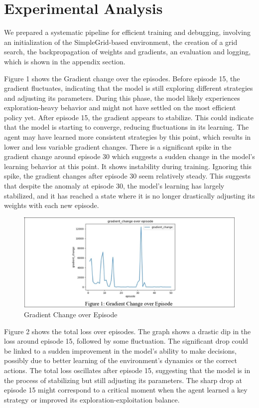 \documentclass[a4paper,11pt]{article}
\begin{document}
\section{Experimental Analysis}

We prepared a systematic pipeline for efficient training and debugging, involving an initialization of the SimpleGrid-based environment, the creation of a grid search, the backpropagation of weights and gradients, an evaluation and logging, which is shown in the appendix section. 

Figure 1 shows the Gradient change over the episodes. Before episode 15, the gradient fluctuates, indicating that the model is still exploring different strategies and adjusting its parameters. During this phase, the model likely experiences exploration-heavy behavior and might not have settled on the most efficient policy yet. After episode 15, the gradient appears to stabilize. This could indicate that the model is starting to converge, reducing fluctuations in its learning. The agent may have learned more consistent strategies by this point, which results in lower and less variable gradient changes. There is a significant spike in the gradient change around episode 30 which suggests a sudden change in the model’s learning behavior at this point. It shows instability during training. Ignoring this spike, the gradient changes after episode 30 seem relatively steady. This suggests that despite the anomaly at episode 30, the model’s learning has largely stabilized, and it has reached a state where it is no longer drastically adjusting its weights with each new episode. 

\begin{figure}[H]
    \centering
    \includegraphics[width=0.75\linewidth]{fig1.png}
    \caption{Gradient Change over Episode}
    \label{fig:enter-label}
\end{figure}


Figure 2 shows the total loss over episodes. The graph shows a drastic dip in the loss around episode 15, followed by some fluctuation. The significant drop could be linked to a sudden improvement in the model’s ability to make decisions, possibly due to better learning of the environment's dynamics or the correct actions. The total loss oscillates after episode 15, suggesting that the model is in the process of stabilizing but still adjusting its parameters. The sharp drop at episode 15 might correspond to a critical moment when the agent learned a key strategy or improved its exploration-exploitation balance. 
\end{document}
